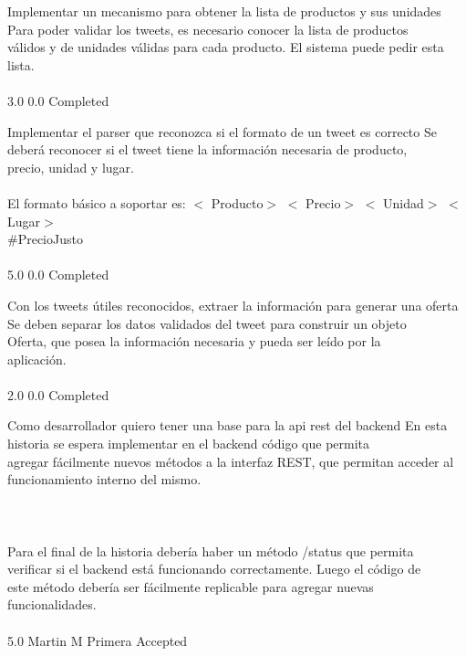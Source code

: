 		{Implementar un mecanismo para obtener la lista de productos y sus unidades} %
		{Para poder validar los tweets, es necesario conocer la lista de productos\\
válidos y de unidades válidas para cada producto. El sistema puede pedir esta\\
lista.\\
\\
} %
		{3.0} %
		{} %
		{0.0} %
		{Completed} %

		{Implementar el parser que reconozca si el formato de un tweet es correcto} %
		{Se deberá reconocer si el tweet tiene la información necesaria de producto,\\
precio, unidad y lugar.\\
\\
El formato básico a soportar es: $<$ Producto$>$  $<$ Precio$>$  $<$ Unidad$>$  $<$ Lugar$>$ \\
#PrecioJusto\\
\\
} %
		{5.0} %
		{} %
		{0.0} %
		{Completed} %

		{Con los tweets útiles reconocidos, extraer la información para generar una oferta} %
		{Se deben separar los datos validados del tweet para construir un objeto\\
Oferta, que posea la información necesaria y pueda ser leído por la\\
aplicación.\\
\\
} %
		{2.0} %
		{} %
		{0.0} %
		{Completed} %


\vspace{20pt}

	{Como desarrollador quiero tener una base para la api rest del backend} %
	{En esta historia se espera implementar en el backend código que permita\\
agregar fácilmente nuevos métodos a la interfaz REST, que permitan acceder al\\
funcionamiento interno del mismo.\\
\\
  \\
\\
Para el final de la historia debería haber un método /status que permita\\
verificar si el backend está funcionando correctamente. Luego el código de\\
este método debería ser fácilmente replicable para agregar nuevas\\
funcionalidades.\\
\\
} %
	{} %
	{5.0} %
	{Martin M} %
	{Primera} %
	{Accepted} %

